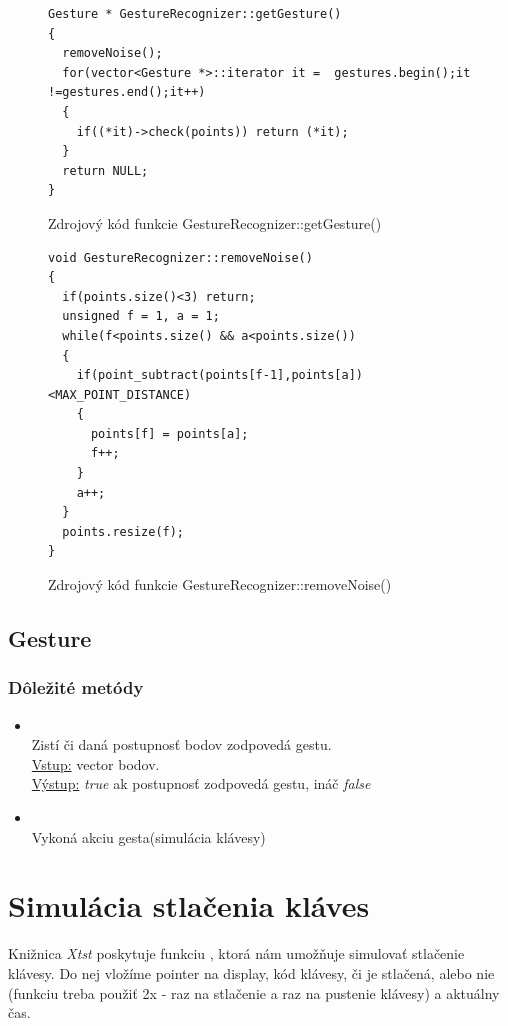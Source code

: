 \begin{figure}[htp]
\begin{lstlisting}
Gesture * GestureRecognizer::getGesture()
{
  removeNoise();
  for(vector<Gesture *>::iterator it =  gestures.begin();it !=gestures.end();it++)
  {
    if((*it)->check(points)) return (*it);
  }
  return NULL;
}
\end{lstlisting}
\caption{Zdrojový kód funkcie GestureRecognizer::getGesture()}
\label{fig:getGesture}
\end{figure}

\begin{figure}[htp]
\begin{lstlisting}
void GestureRecognizer::removeNoise()
{  
  if(points.size()<3) return;
  unsigned f = 1, a = 1;
  while(f<points.size() && a<points.size())
  {
    if(point_subtract(points[f-1],points[a])<MAX_POINT_DISTANCE)
    {
      points[f] = points[a];
      f++;
    }
    a++;
  }
  points.resize(f);
}
\end{lstlisting}
\caption{Zdrojový kód funkcie GestureRecognizer::removeNoise()}
\label{fig:removeNoise}
\end{figure}


\subsection{Gesture}

\subsubsection{Dôležité metódy}
\begin{itemize}
\item {}
\\Zistí či daná postupnosť bodov zodpovedá gestu.
\\ \underline{Vstup:} vector bodov.
\\ \underline{Výstup:} \textit{true} ak postupnosť zodpovedá gestu, ináč \textit{false}
\item {}
\\Vykoná akciu gesta(simulácia klávesy)
\end{itemize}


\section{Simulácia stlačenia kláves}
Knižnica \textit{Xtst} poskytuje funkciu , ktorá nám umožňuje simulovať stlačenie klávesy. Do nej vložíme pointer na display, kód klávesy, či je stlačená, alebo nie (funkciu treba použiť 2x - raz na stlačenie a raz na pustenie klávesy) a aktuálny čas.

